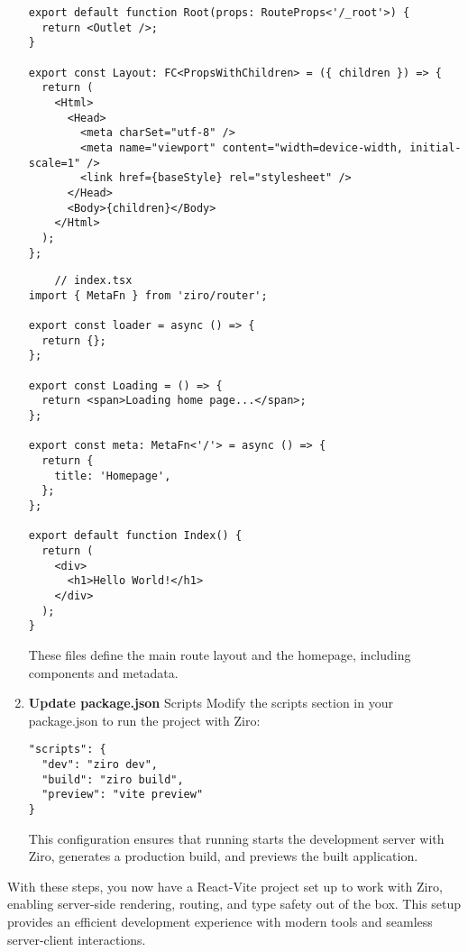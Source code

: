 \begin{enumerate}
\begin{verbatim}
export default function Root(props: RouteProps<'/_root'>) {
  return <Outlet />;
}

export const Layout: FC<PropsWithChildren> = ({ children }) => {
  return (
    <Html>
      <Head>
        <meta charSet="utf-8" />
        <meta name="viewport" content="width=device-width, initial-scale=1" />
        <link href={baseStyle} rel="stylesheet" />
      </Head>
      <Body>{children}</Body>
    </Html>
  );
};
  \end{verbatim}

  \begin{verbatim}
    // index.tsx
import { MetaFn } from 'ziro/router';

export const loader = async () => {
  return {};
};

export const Loading = () => {
  return <span>Loading home page...</span>;
};

export const meta: MetaFn<'/'> = async () => {
  return {
    title: 'Homepage',
  };
};

export default function Index() {
  return (
    <div>
      <h1>Hello World!</h1>
    </div>
  );
}
      \end{verbatim}
      These files define the main route layout and the homepage, including components and metadata.


      \item \textbf{Update package.json} Scripts Modify the scripts section in your package.json to run the project with Ziro:
\begin{verbatim}
"scripts": {
  "dev": "ziro dev",
  "build": "ziro build",
  "preview": "vite preview"
}
\end{verbatim}
This configuration ensures that running  starts the development server with Ziro,  generates a production build, and  previews the built application.


\end{enumerate}

With these steps, you now have a React-Vite project set up to work with Ziro, enabling server-side rendering, routing, and type safety out of the box. This setup provides an efficient development experience with modern tools and seamless server-client interactions.

\pagebreak
